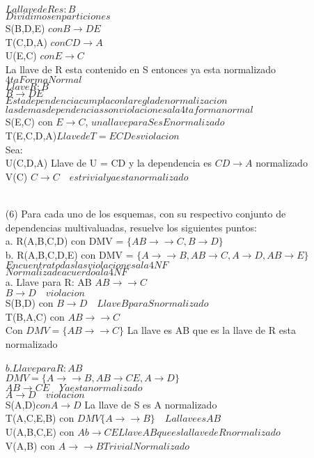 \documentclass{article}
\begin{document}
\begin{enumerate}
$La llave de R es: B$\\
$Dividimos en particiones$\\
S(B,D,E) $con B \rightarrow DE$\\
T(C,D,A) $con CD \rightarrow A$\\
U(E,C) $con E \rightarrow C$\\
La llave de R esta contenido en S entonces ya esta normalizado\\
$4ta Forma Normal$\\
$Llave R: B$\\
$B\rightarrow DE$ \\$Esta dependencia cumpla con la regla de normalizacion$\\
$las demas dependencias son violaciones a la 4ta forma normal$\\
S(E,C) con $E \rightarrow C$, $una llave para S es E normalizado$\\
T(E,C,D,A)$ Llave de T = ECD es violacion$\\
Sea:\\
U(C,D,A) Llave de U = CD y la dependencia es $CD \rightarrow A$ normalizado\\
V(C) $C\rightarrow C \quad es trivial ya esta normalizado$\\
\\
\item[(6)]Para cada uno de los esquemas, con su respectivo conjunto de dependencias multivaluadas,
resuelve los siguientes puntos:\\
a. R(A,B,C,D) con DMV = $ \{ AB \rightarrow \rightarrow C, B \rightarrow D \} $\\
b. R(A,B,C,D,E) con DMV = $\{ A \rightarrow \rightarrow B, AB \rightarrow C, A \rightarrow D, AB \rightarrow E\}$\\
$Encuentra todas las violaciones a la 4NF$\\
$Normaliza de acuerdo a la 4NF$\\
a. Llave para R: AB
$AB\rightarrow\rightarrow C$\\
$B\rightarrow D \quad violacion$\\
S(B,D) con $B \rightarrow D \quad Llave B para S normalizado$\\
T(B,A,C) con $AB\rightarrow\rightarrow C$\\
Con $DMV=\{AB\rightarrow\rightarrow C\} $ La llave es AB que es la llave de R esta normalizado\\
\\
$b. Llave para R: AB$\\
$DMV= \{A \rightarrow\rightarrow B, AB\rightarrow CE,  A\rightarrow D \}$\\
$AB \rightarrow CE \quad Ya esta normalizado$\\
$A \rightarrow D \quad violacion$\\
S(A,D)$ con A\rightarrow D$ La llave de S es A normalizado\\
T(A,C,E,B) con $DMV\{A\rightarrow\rightarrow B\} \quad La llave es AB$\\
U(A,B,C,E) con $Ab \rightarrow CE Llave AB que es la llave de R normalizado$\\
V(A,B) con $A\rightarrow\rightarrow B Trivial Normalizado$\\
\end{enumerate}
\end{document}

